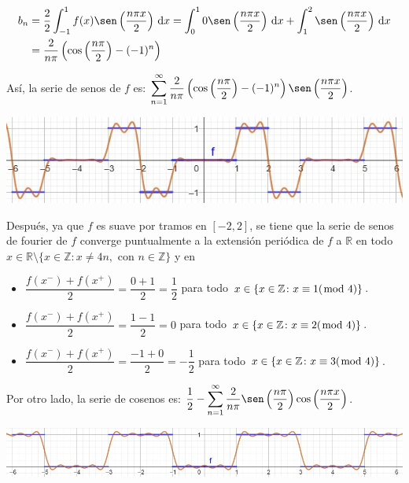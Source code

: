 \documentclass[fleqn]{article}
\newcommand{\real}{\mathbb{R}}
\newcommand{\ent}{\mathbb{Z}}
\newcommand{\intg}[3]{\int_{#1}^{#2} #3 \, \mathrm{d}x}
\begin{document}
\begin{enumerate}[I.]
\begin{enumerate}[(1)]
			\begin{align*}
				b_n &= \dfrac{2}{2} \intg{-1}{1}{f(x) \sen \left( \dfrac{n \pi x}{2} \right)} = \intg{0}{1}{0 \sen \left( \dfrac{n \pi x}{2} \right)} + \intg{1}{2}{\sen \left( \dfrac{n \pi x}{2} \right)} \\
				&= \dfrac{2}{n \pi} \left( \cos \left( \dfrac{n \pi}{2} \right) - (-1)^n \right)
			\end{align*}

			Así, la serie de senos de $ f $ es: $ \displaystyle \sum_{n=1}^{\infty} \dfrac{2}{n \pi} \left( \cos \left( \dfrac{n \pi}{2} \right) - (-1)^n \right) \sen \left( \dfrac{n \pi x}{2} \right) $.

			\includegraphics[width=0.95\linewidth]{Ejer6s.jpg}

			Después, ya que $f$ es suave por tramos en $ [-2,2] $, se tiene que la serie de senos de fourier de $f$ converge puntualmente a la extensión periódica de $f$ a $ \real $ en todo $ x \in \real \setminus \{ x \in \ent \colon x \neq 4n, \mbox{ con } n \in \ent \} $ y en

			\begin{itemize}
				\item $ \dfrac{f(x^-) + f(x^+)}{2} = \dfrac{0+1}{2} = \dfrac{1}{2} $ para todo $ x \in \{ x \in \ent \colon x \equiv 1 (\hspace{-2mm} \mod 4) \} $.
				
				\item $ \dfrac{f(x^-) + f(x^+)}{2} = \dfrac{1-1}{2} = 0 $ para todo $ x \in \{ x \in \ent \colon x \equiv 2 (\hspace{-2mm} \mod 4) \} $.
				
				\item $ \dfrac{f(x^-) + f(x^+)}{2} = \dfrac{-1+0}{2} = -\dfrac{1}{2} $ para todo $ x \in \{ x \in \ent \colon x \equiv 3 (\hspace{-2mm} \mod 4) \} $.
			\end{itemize}

			Por otro lado, la serie de cosenos es: $ \displaystyle \dfrac{1}{2} - \sum_{n=1}^{\infty} \dfrac{2}{n \pi} \sen \left( \dfrac{n \pi}{2} \right) \cos \left( \dfrac{n \pi x}{2} \right) $.

			\includegraphics[width=0.95\linewidth]{Ejer6c.jpg}


\end{enumerate}
\end{enumerate}
\end{document}
